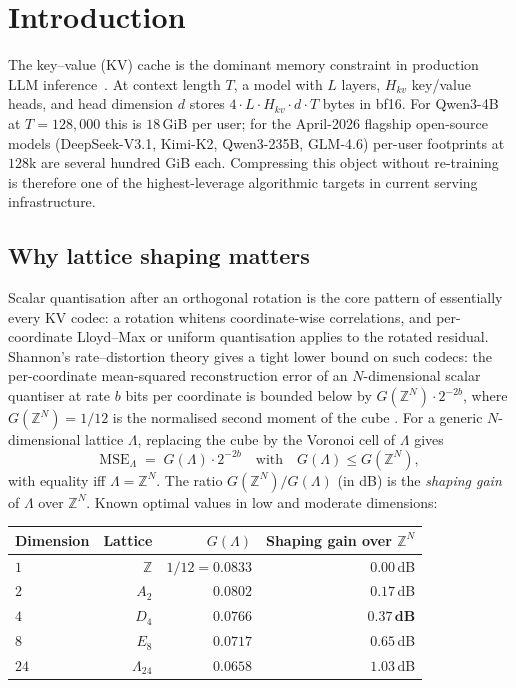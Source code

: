 \documentclass[11pt,a4paper]{article}
\theoremstyle{definition}
\theoremstyle{plain}
\newcommand{\Z}{\mathbb{Z}}
\begin{document}
\section{Introduction}
\label{sec:intro}

The key--value (KV) cache is the dominant memory constraint in
production LLM inference~\cite{h2o,scissorhands,deepseekv3}. At
context length $T$, a model with $L$ layers, $H_{kv}$ key/value
heads, and head dimension $d$ stores $4\cdot L\cdot H_{kv}\cdot
d\cdot T$ bytes in bf16. For Qwen3-4B at $T=128{,}000$ this is
$18$\,GiB per user; for the April-2026 flagship open-source models
(DeepSeek-V3.1, Kimi-K2, Qwen3-235B, GLM-4.6) per-user footprints at
$128$k are several hundred GiB each.  Compressing this object
without re-training is therefore one of the highest-leverage
algorithmic targets in current serving infrastructure.

\subsection{Why lattice shaping matters}

Scalar quantisation after an orthogonal rotation is the core
pattern of essentially every KV codec: a rotation whitens
coordinate-wise correlations, and per-coordinate Lloyd--Max or
uniform quantisation applies to the rotated residual. Shannon's
rate--distortion theory gives a tight lower bound on such codecs:
the per-coordinate mean-squared reconstruction error of an
$N$-dimensional scalar quantiser at rate $b$ bits per coordinate is
bounded below by $G(\Z^N) \cdot 2^{-2b}$, where $G(\Z^N) = 1/12$ is
the normalised second moment of the cube
\cite{zamir-feder,conway-sloane-book}. For a generic $N$-dimensional
lattice $\Lambda$, replacing the cube by the Voronoi cell of
$\Lambda$ gives
\begin{equation}
  \label{eq:shaping-gap}
  \text{MSE}_\Lambda \;=\; G(\Lambda) \cdot 2^{-2b}
  \quad\text{with}\quad
  G(\Lambda) \leq G(\Z^N),
\end{equation}
with equality iff $\Lambda = \Z^N$. The ratio $G(\Z^N)/G(\Lambda)$
(in dB) is the \emph{shaping gain} of $\Lambda$ over $\Z^N$. Known
optimal values in low and moderate dimensions:
\begin{center}
\begin{tabular}{lrrr}
  \toprule
  Dimension & Lattice & $G(\Lambda)$ & Shaping gain over $\Z^N$ \\
  \midrule
  $1$  & $\Z$          & $1/12 = 0.0833$ & $0.00\,$dB \\
  $2$  & $A_2$         & $0.0802$        & $0.17\,$dB \\
  $4$  & $D_4$         & $0.0766$        & $\mathbf{0.37\,\text{dB}}$ \\
  $8$  & $E_8$         & $0.0717$        & $0.65\,$dB \\
  $24$ & $\Lambda_{24}$ & $0.0658$        & $1.03\,$dB \\
  \bottomrule
\end{tabular}
\end{center}
\end{document}
